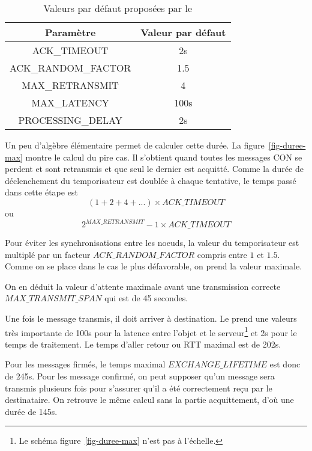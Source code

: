          \vspace{1em}

\begin{table}
\begin{center}
\begin{tabular}{|c|c|}
\hline
 \rowcolor{purple!10} Paramètre & Valeur par défaut  \\ \hline \hline
 ACK\_TIMEOUT & 2s \\ \hline
 ACK\_RANDOM\_FACTOR & 1.5 \\ \hline
 MAX\_RETRANSMIT & 4 \\ \hline
 MAX\_LATENCY & 100s \\ \hline
 PROCESSING\_DELAY & 2s \\ \hline
 
\end{tabular}
\end{center}
\caption{Valeurs par défaut proposées par le }
\label{tab-data-rate}
\end{table}

Un peu d’algèbre élémentaire permet de calculer cette durée. La figure~\vref{fig-duree-max} montre le calcul du pire cas. Il s'obtient quand toutes les messages CON se perdent et sont retransmis et que seul le dernier est acquitté. Comme la durée de déclenchement du temporisateur est doublée à chaque tentative, le temps passé dans cette étape est $$(1 + 2 + 4 + ...) \times ACK\_TIMEOUT$$ ou $$ 2^{MAX\_RETRANSMIT}-1 \times ACK\_TIMEOUT$$


Pour éviter les synchronisations entre les noeuds, la valeur du temporisateur est multiplé par un facteur $ACK\_RANDOM\_FACTOR$ compris entre $1$ et $1.5$. Comme on se place dans le cas le plus défavorable, on prend la valeur maximale.

On en déduit la valeur d'attente maximale avant une transmission correcte $MAX\_TRANSMIT\_SPAN$ qui est de 45 secondes.

         \vspace{1em}


Une fois le message transmis, il doit arriver à destination. Le  prend une valeurs très importante de 100s pour la latence entre l'objet et le serveur\footnote{Le schéma figure~\vref{fig-duree-max} n'est pas à l'échelle.} et 2s pour le temps de traitement. Le temps d'aller retour ou \ac{RTT} maximal est de 202s.

         \vspace{1em}

Pour les messages firmés, le temps maximal $EXCHANGE\_LIFETIME$ est donc de 245s. Pour les message  confirmé, on peut supposer qu'un message sera transmis plusieurs fois pour s'assurer qu'il a été correctement reçu par le destinataire. On retrouve le même calcul sans la partie acquittement, d'où une durée de 145s.


